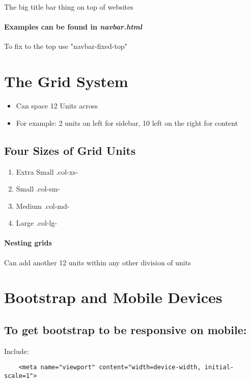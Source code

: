 \documentclass{article}
\begin{document}
	The big title bar thing on top of websites

	\paragraph{Examples can be found in \textit{navbar.html}}
	
	To fix to the top use "navbar-fixed-top"
	
\section{The Grid System}

	\begin{itemize}
		\itemsep0em
		\item Can space 12 Units across
		\item For example: 2 units on left for sidebar, 10 left on the right for content
	\end{itemize}
	
	\subsection*{Four Sizes of Grid Units}
	\begin{enumerate}
	\itemsep0em
	\item Extra Small .col-xs-
	\item Small .col-sm-
	\item Medium .col-md-
	\item Large .col-lg-
	\end{enumerate}

	\paragraph*{Nesting grids} Can add another 12 units within any other division of units


\section{Bootstrap and Mobile Devices}

	\subsection*{To get bootstrap to be responsive on mobile:}
	Include: 
	\begin{verbatim} 
	<meta name="viewport" content="width=device-width, initial-scale=1">
	\end{verbatim}
\end{document}
